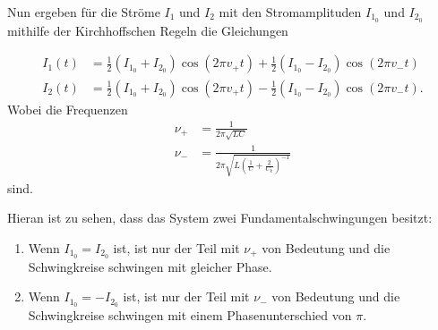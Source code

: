 Nun ergeben für die Ströme $I_1$ und $I_2$ mit den Stromamplituden $I_{1_0}$ und $I_{2_0}$ mithilfe der Kirchhoffschen Regeln die Gleichungen

\begin{align}
    \label{eq:strom}
    I_1(t) &= \frac{1}{2} (I_{1_0} + I_{2_0})\cos(2 \pi v_+ t) + \frac{1}{2} (I_{1_0} - I_{2_0})\cos(2 \pi v_- t) \\
    I_2(t) &= \frac{1}{2} (I_{1_0} + I_{2_0})\cos(2 \pi v_+ t) - \frac{1}{2} (I_{1_0} - I_{2_0})\cos(2 \pi v_- t).
\end{align}
Wobei die Frequenzen
\begin{align}
    \label{eq:frequenzen}
    \nu _+ &= \frac{1}{2 \pi \sqrt{L C}} \\
    \nu _- &= \frac{1}{2 \pi \sqrt{L \left( \frac{1}{C} + \frac{2}{C_k} \right)^{-1}}}
\end{align}
sind.\cite{V355}

Hieran ist zu sehen, dass das System zwei Fundamentalschwingungen besitzt:
\begin{enumerate}
\item Wenn $I_{1_0} = I_{2_0}$ ist, ist nur der Teil mit $\nu _+$ von Bedeutung und die Schwingkreise schwingen mit gleicher Phase.
\item Wenn $I_{1_0} = - I_{2_0}$ ist, ist nur der Teil mit $\nu _-$ von Bedeutung und die Schwingkreise schwingen mit einem Phasenunterschied von $\pi$.
\end{enumerate}


